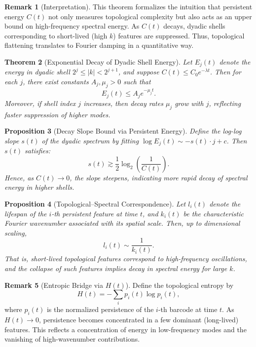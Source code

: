 \documentclass[11pt]{article}
\newtheorem{theorem}{Theorem}[section]
\newtheorem{proposition}[theorem]{Proposition}
\theoremstyle{definition}
\newtheorem{remark}[theorem]{Remark}
\begin{document}
\begin{remark}[Interpretation]
This theorem formalizes the intuition that persistent energy $C(t)$ not only measures topological complexity but also acts as an upper bound on high-frequency spectral energy. As $C(t)$ decays, dyadic shells corresponding to short-lived (high $k$) features are suppressed. Thus, topological flattening translates to Fourier damping in a quantitative way.
\end{remark}

\begin{theorem}[Exponential Decay of Dyadic Shell Energy]
Let $E_j(t)$ denote the energy in dyadic shell $2^j \le |k| < 2^{j+1}$, and suppose $C(t) \le C_0 e^{-\lambda t}$. Then for each $j$, there exist constants $A_j, \mu_j > 0$ such that
\[
E_j(t) \le A_j e^{-\mu_j t}.
\]
Moreover, if shell index $j$ increases, then decay rates $\mu_j$ grow with $j$, reflecting faster suppression of higher modes.
\end{theorem}

\begin{proposition}[Decay Slope Bound via Persistent Energy]
Define the log-log slope $s(t)$ of the dyadic spectrum by fitting $\log E_j(t) \sim -s(t) \cdot j + c$. Then $s(t)$ satisfies:
\[
s(t) \gtrsim \frac{1}{2} \log_2 \left(\frac{1}{C(t)}\right).
\]
Hence, as $C(t) \to 0$, the slope steepens, indicating more rapid decay of spectral energy in higher shells.
\end{proposition}

\begin{proposition}[Topological--Spectral Correspondence]
Let $l_i(t)$ denote the lifespan of the $i$-th persistent feature at time $t$, and $k_i(t)$ be the characteristic Fourier wavenumber associated with its spatial scale. Then, up to dimensional scaling,
\[
l_i(t) \sim \frac{1}{k_i(t)}.
\]
That is, short-lived topological features correspond to high-frequency oscillations, and the collapse of such features implies decay in spectral energy for large $k$.
\end{proposition}

\begin{remark}[Entropic Bridge via $H(t)$]
Define the topological entropy by
\[
H(t) = -\sum_i p_i(t) \log p_i(t),
\]
where $p_i(t)$ is the normalized persistence of the $i$-th barcode at time $t$. As $H(t) \to 0$, persistence becomes concentrated in a few dominant (long-lived) features. This reflects a concentration of energy in low-frequency modes and the vanishing of high-wavenumber contributions.
\end{remark}
\end{document}
